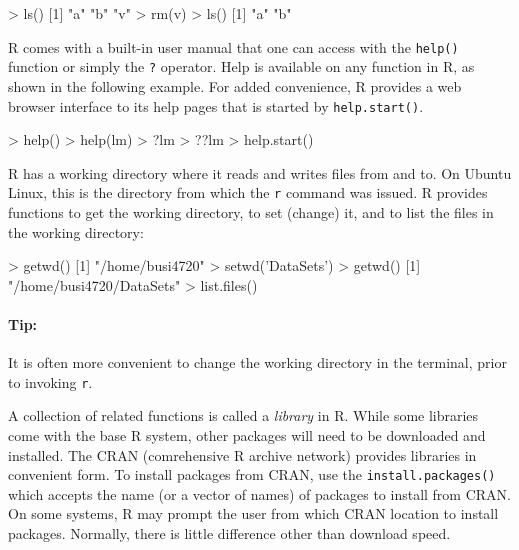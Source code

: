 \begin{samepage}
\begin{Rcode}
> ls()
[1] "a"          "b"          "v"
> rm(v)
> ls()
[1] "a"          "b"
\end{Rcode}
\end{samepage}

R comes with a built-in user manual that one can access with the \texttt{help()} function or simply the \texttt{?} operator. Help is available on any function in R, as shown in the following example. For added convenience, R provides a web browser interface to its help pages that is started by \texttt{help.start()}.

\begin{samepage}
\begin{Rcode}
> help()
> help(lm)
> ?lm
> ??lm
> help.start()
\end{Rcode}
\end{samepage}

R has a working directory where it reads and writes files from and to. On Ubuntu Linux, this is the directory from which the \texttt{r} command was issued. R provides functions to get the working directory, to set (change) it, and to list the files in the working directory:

\begin{samepage}
\begin{Rcode}
> getwd()
[1] "/home/busi4720"
> setwd('DataSets')
> getwd()
[1] "/home/busi4720/DataSets"
> list.files()
\end{Rcode}
\end{samepage}

\begin{tcolorbox}[colback=code]
\paragraph*{Tip:} It is often more convenient to change the working directory in the terminal, prior to invoking \texttt{r}.
\end{tcolorbox}

A collection of related functions is called a \emph{library} in R. While some libraries come with the base R system, other packages will need to be downloaded and installed. The CRAN (comrehensive R archive network) provides libraries in convenient form. To install packages from CRAN, use the \texttt{install.packages()} which accepts the name (or a vector of names) of packages to install from CRAN. On some systems, R may prompt the user from which CRAN location to install packages. Normally, there is little difference other than download speed. 

